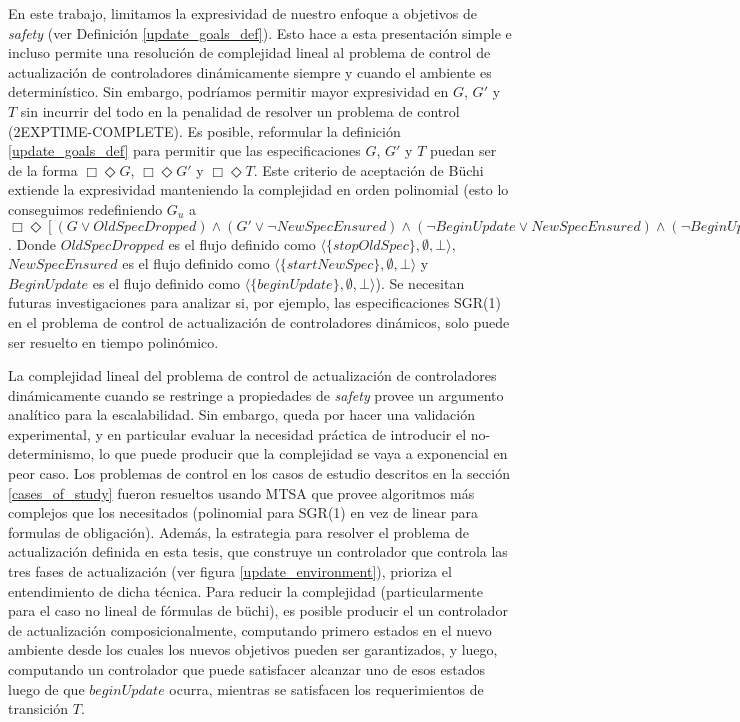 En este trabajo, limitamos la expresividad de nuestro enfoque a objetivos de \emph{safety} (ver Definición
\ref{update_goals_def}). Esto hace a esta presentación simple e incluso permite una resolución de complejidad lineal al
problema de control de actualización de controladores dinámicamente siempre y cuando el ambiente es determinístico. Sin
embargo, podríamos permitir mayor expresividad en $G$, $G'$ y $T$ sin incurrir del todo en la penalidad de resolver un
problema de control (2EXPTIME-COMPLETE). Es posible, reformular la definición \ref{update_goals_def} para permitir que
las especificaciones $G$, $G'$ y $T$ puedan ser de la forma $\Box \Diamond G$, $\Box \Diamond G'$ y $\Box \Diamond T$.
Este criterio de aceptación de Büchi extiende la expresividad manteniendo la complejidad en orden polinomial (esto lo
conseguimos redefiniendo $G_u$ a $\Box \Diamond [(G \lor OldSpecDropped) \wedge (G' \lor \neg NewSpecEnsured) \wedge
(\neg BeginUpdate \lor NewSpecEnsured) \wedge (\neg BeginUpdate \lor  OldSpecDropped) \wedge  T]$. Donde
$OldSpecDropped$ es el flujo definido como $\langle \{stopOldSpec\},\emptyset,\bot\rangle$, $NewSpecEnsured$ es el flujo
definido como $\langle \{startNewSpec\},\emptyset,\bot\rangle$ y $BeginUpdate$ es el flujo definido como $\langle
\{beginUpdate\},\emptyset,\bot\rangle$). Se necesitan futuras investigaciones para analizar si, por ejemplo, las
especificaciones SGR(1) \cite{D'ippolito:2013:SNE:2430536.2430543} en el problema de control de actualización de
controladores dinámicos, solo puede ser resuelto en tiempo polinómico.

La complejidad lineal del problema de control de actualización de controladores dinámicamente cuando se restringe a
propiedades de \emph{safety} provee un argumento analítico para la escalabilidad. Sin embargo, queda por hacer una
validación experimental, y en particular evaluar la necesidad práctica de introducir el no-determinismo, lo que puede
producir que la complejidad se vaya a exponencial en peor caso. Los problemas de control en los casos de estudio
descritos en la sección \ref{cases_of_study} fueron resueltos usando MTSA que provee algoritmos más complejos que los
necesitados (polinomial para SGR(1) en vez de linear para formulas de obligación). Además, la estrategia para resolver
el problema de actualización definida en esta tesis, que construye un controlador que controla las tres fases de
actualización (ver figura \ref{update_environment}), prioriza el entendimiento de dicha técnica. Para reducir la
complejidad (particularmente para el caso no lineal de fórmulas de büchi), es posible producir el un controlador de
actualización composicionalmente, computando primero estados en el nuevo ambiente desde los cuales los nuevos objetivos
pueden ser garantizados, y luego, computando un controlador que puede satisfacer alcanzar uno de esos estados luego de
que $beginUpdate$ ocurra, mientras se satisfacen los requerimientos de transición $T$.

